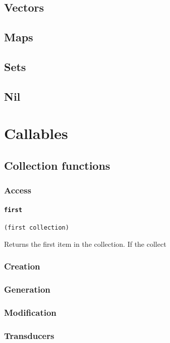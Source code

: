 \documentclass[11pt]{scrreprt}
\begin{document}
\section{Vectors}

\section{Maps}

\section{Sets}

\section{Nil}


\chapter{Callables}
\section{Collection functions}
\subsection{Access}
\subsubsection{\texttt{first}}
\begin{verbatim}
(first collection)
\end{verbatim}

Returns the first item in the collection. If the collect


\subsection{Creation}

\subsection{Generation}

\subsection{Modification}

\subsection{Transducers}
\end{document}
